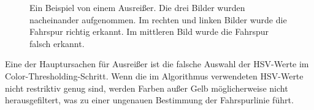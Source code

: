 \documentclass[arbeit=studie,oneside,BCOR=12mm]{ArbeitRST}
\begin{document}
\begin{figure}[h]
    \centering
    \caption{Ein Beispiel von einem Ausrei{\ss}er. Die drei Bilder wurden
    nacheinander aufgenommen. Im rechten und linken Bilder wurde die Fahrspur
    richtig erkannt. Im mittleren Bild wurde die Fahrspur falsch erkannt.}
    \label{ausrei}
\end{figure}

Eine der Hauptursachen für Ausreißer ist die falsche Auswahl der HSV-Werte im
Color-Thresholding-Schritt. Wenn die im Algorithmus verwendeten HSV-Werte nicht
restriktiv genug sind, werden Farben außer Gelb möglicherweise nicht
herausgefiltert, was zu einer ungenauen Bestimmung der Fahrspurlinie führt.
\end{document}
